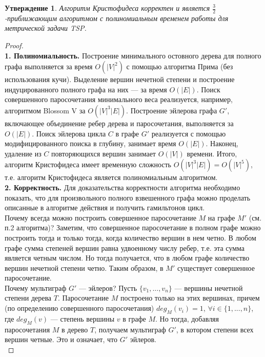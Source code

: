 \documentclass[a4paper]{article}
\newtheorem{claim}{Утверждение}
\begin{document}
\begin{claim}
    Алгоритм Кристофидеса корректен и является $\frac{3}{2}$-приближающим алгоритмом с полиномиальным временем работы для метрической задачи TSP.
\end{claim}
\begin{proof}~\\    
    \textbf{1. Полиномиальность.} Построение минимального остовного дерева для полного графа выполняется за время $O(|V|^2)$ с помощью алгоритма Прима (без использования кучи). Выделение вершин нечетной степени и построение индуцированного полного графа на них --- за время $O(|E|)$. Поиск совершенного паросочетания минимального веса реализуется, например, алгоритмом Blossom V за $O(|V|^3|E|)$. Построение эйлерова графа $G'$, включающее объединение ребер дерева и паросочетания, выполняется за $O(|E|)$. Поиск эйлерова цикла $C$ в графе $G'$ реализуется с помощью модифицированного поиска в глубину, занимает время $O(|E|)$. Наконец, удаление из $C$ повторяющихся вершин занимает $O(|V|)$ времени. Итого, алгоритм Кристофидеса имеет временную сложность $O(|V|^3|E|)=O(|V|^5)$, т.е. алгоритм Кристофидеса является полиномиальным алгоритмом.\\
    \textbf{2. Корректность.} Для доказательства корректности алгоритма необходимо показать, что для произвольного полного взвешенного графа можно проделать описанные в алгоритме действия и получить гамильтонов цикл.\\
    
    Почему всегда можно построить совершенное паросочетание $M$ на графе $M'$ (см. п.2 алгоритма)? Заметим, что совершенное паросочетание в полном графе можно построить тогда и только тогда, когда количество вершин в нем четно. В любом графе сумма степеней вершин равна удвоенному числу ребер, т.е. эта сумма является четным числом. Но тогда получается, что в любом графе количество вершин нечетной степени четно. Таким образом, в $M'$ существует совершенное паросочетание.\\
    
    Почему мультиграф $G'$ --- эйлеров? Пусть $\{v_1,...,v_n\}$ --- вершины нечетной степени дерева $T$. Паросочетание $M$ построено только на этих вершинах, причем (по определению совершенного паросочетания) $deg_M(v_i) = 1$, $\forall i\in \{1,...,n\}$, где $deg_M(v)$ --- степень вершины $v$ в графе $M$. Но тогда, добавляя паросочетания $M$ в дерево $T$, получаем мультиграф $G'$, в котором степени всех вершин четные. Это и означает, что $G'$ эйлеров.\\
    

\end{proof}
\end{document}
